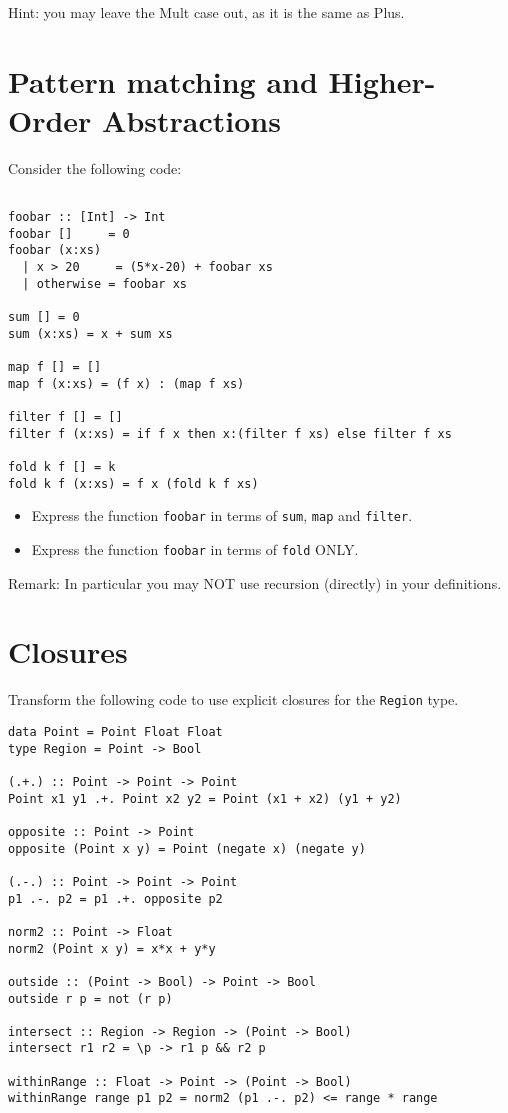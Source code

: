 \documentclass{article}
\newcommand{\answer}[1]{}
\begin{document}
Hint: you may leave the Mult case out, as it is the same as Plus.

\newpage
\section{Pattern matching and Higher-Order Abstractions}

Consider the following code:
\begin{verbatim}

foobar :: [Int] -> Int
foobar []     = 0
foobar (x:xs)
  | x > 20     = (5*x-20) + foobar xs
  | otherwise = foobar xs

sum [] = 0
sum (x:xs) = x + sum xs

map f [] = []
map f (x:xs) = (f x) : (map f xs)

filter f [] = []
filter f (x:xs) = if f x then x:(filter f xs) else filter f xs

fold k f [] = k
fold k f (x:xs) = f x (fold k f xs)
\end{verbatim}

\begin{itemize}
  \item Express the function \texttt{foobar} in terms of \texttt{sum}, \texttt{map} and \texttt{filter}.
  \item Express the function \texttt{foobar} in terms of \texttt{fold} ONLY.
\end{itemize}

Remark: In particular you may NOT use recursion (directly) in your definitions.

\answer{
  \begin{verbatim}
  foobar = sum . map (\x -> 7*x+2) . filter (>3)
  foobar = fold 0 f where
     f x acc = if x > 3 then 7*x + 2 + acc else acc
   \end{verbatim}
}

\newpage
\section{Closures}

Transform the following code to use explicit closures for the
\texttt{Region} type.

\begin{verbatim}
data Point = Point Float Float
type Region = Point -> Bool

(.+.) :: Point -> Point -> Point
Point x1 y1 .+. Point x2 y2 = Point (x1 + x2) (y1 + y2)

opposite :: Point -> Point
opposite (Point x y) = Point (negate x) (negate y)

(.-.) :: Point -> Point -> Point
p1 .-. p2 = p1 .+. opposite p2

norm2 :: Point -> Float
norm2 (Point x y) = x*x + y*y

outside :: (Point -> Bool) -> Point -> Bool
outside r p = not (r p)

intersect :: Region -> Region -> (Point -> Bool)
intersect r1 r2 = \p -> r1 p && r2 p

withinRange :: Float -> Point -> (Point -> Bool)
withinRange range p1 p2 = norm2 (p1 .-. p2) <= range * range
\end{verbatim}
\end{document}
